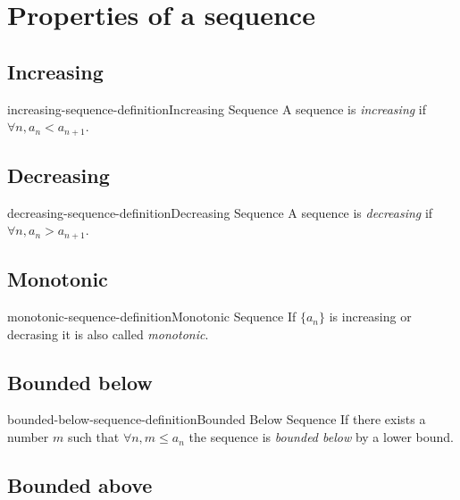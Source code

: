 \documentclass[preview]{standalone}
\begin{document}
\section{Properties of a sequence}

\subsection{Increasing}

\begin{snippetdefinition}{increasing-sequence-definition}{Increasing Sequence}
    A sequence is \textit{increasing} if \(\forall n, a_n<a_{n+1}\).
\end{snippetdefinition}

\subsection{Decreasing}

\begin{snippetdefinition}{decreasing-sequence-definition}{Decreasing Sequence}
    A sequence is \textit{decreasing} if \(\forall n, a_n>a_{n+1}\).
\end{snippetdefinition}

\subsection{Monotonic}

\begin{snippetdefinition}{monotonic-sequence-definition}{Monotonic Sequence}
    If \(\{a_n\}\) is increasing or decrasing it is also called \textit{monotonic}.
\end{snippetdefinition}

\subsection{Bounded below}

\begin{snippetdefinition}{bounded-below-sequence-definition}{Bounded Below Sequence}
    If there exists a number \(m\) such that \(\forall n, m \leq a_n\)
    the sequence is \textit{bounded below} by a lower bound.
\end{snippetdefinition}

\subsection{Bounded above}
\end{document}
